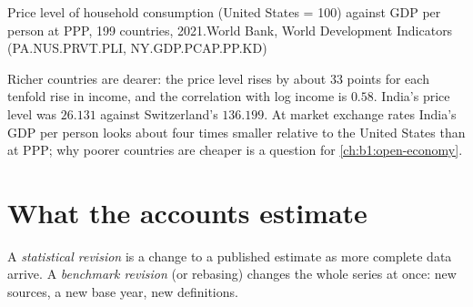 \begin{omchart}{Price level of household consumption (United States = 100)
against GDP per person at PPP, 199 countries, 2021.}{World Bank, World
Development Indicators (PA.NUS.PRVT.PLI, NY.GDP.PCAP.PP.KD)}
\end{omchart}

Richer countries are dearer: the price level rises by about 33 points for
each tenfold rise in income, and the correlation with log income is $0.58$.
India's price level was $26.131$ against Switzerland's $136.199$. %
At market exchange rates India's GDP per person looks about four times
smaller relative to the United States than at PPP; why poorer countries are
cheaper is a question for \cref{ch:b1:open-economy}.

\section{What the accounts estimate}\label{sec:b1:national-accounts-in-depth:revisions}

\begin{definition}\label{def:b1:national-accounts-in-depth:revision}
A \emph{statistical revision} is a change to a published estimate as more
complete data arrive. A \emph{benchmark revision} (or rebasing) changes the
whole series at once: new sources, a new base year, new definitions.
\end{definition}

